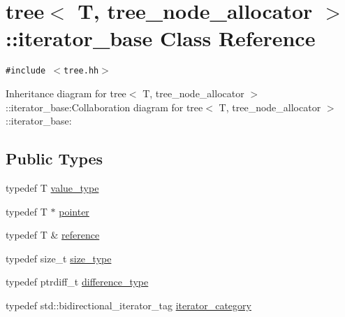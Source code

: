 \hypertarget{classtree_1_1iterator__base}{
\section{tree$<$ T, tree\_\-node\_\-allocator $>$::iterator\_\-base Class Reference}
\label{classtree_1_1iterator__base}
}
{\tt \#include $<$tree.hh$>$}

Inheritance diagram for tree$<$ T, tree\_\-node\_\-allocator $>$::iterator\_\-base:Collaboration diagram for tree$<$ T, tree\_\-node\_\-allocator $>$::iterator\_\-base:\subsection*{Public Types}
\begin{CompactItemize}
\item 
typedef T \hyperlink{classtree_1_1iterator__base_ab430bec9e607ae24cdd2bdffe3faf70}{value\_\-type}
\item 
typedef T $\ast$ \hyperlink{classtree_1_1iterator__base_0665bed45269b6f7b97809ea9920008e}{pointer}
\item 
typedef T \& \hyperlink{classtree_1_1iterator__base_063faf883017de195e7e72cf55be6914}{reference}
\item 
typedef size\_\-t \hyperlink{classtree_1_1iterator__base_a2b239ac4db713d5b191e696584a9076}{size\_\-type}
\item 
typedef ptrdiff\_\-t \hyperlink{classtree_1_1iterator__base_eff66472181aa05d50c7ffe4a91dc4c0}{difference\_\-type}
\item 
typedef std::bidirectional\_\-iterator\_\-tag \hyperlink{classtree_1_1iterator__base_7d0ace14418254eaab7526f1d0aabf40}{iterator\_\-category}
\end{CompactItemize}
